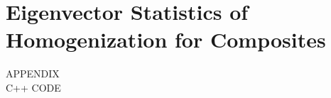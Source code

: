 \documentclass[english,12pt]{ttuthes}
\begin{document}
\section{Eigenvector Statistics of Homogenization for Composites}
\label{sec:Evec_Stats_of_Composites}
%












 
\newpage

\nocite{*}
\backmatter
\vspace{\baselineskip}
\renewcommand{\baselinestretch}{1.0}\selectfont



\vspace{-\baselineskip}






\newpage
\begin{appendix}
 \setcounter{equation}{0}

\begin{center}APPENDIX \\C++ CODE\end{center}

\newpage

\end{appendix}
\end{document}

